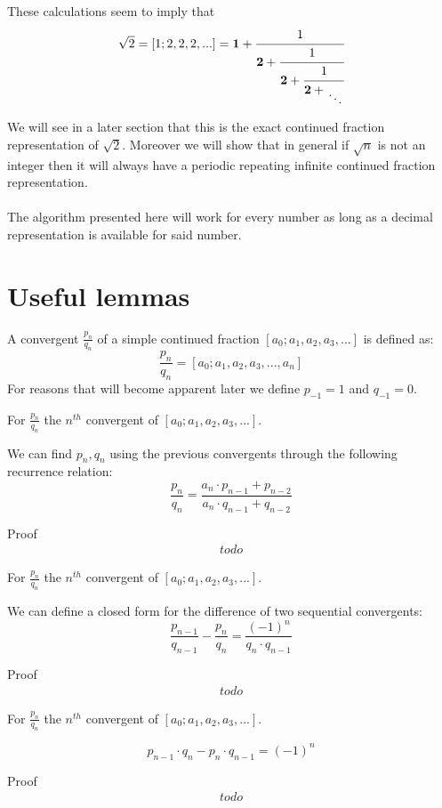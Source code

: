 \documentclass[a4paper]{article}
\begin{document}
These calculations seem to imply that 
$$
\sqrt{2} = [1;2,2,2,...] =
\textbf{1} + \cfrac{1}{\textbf{2}+\cfrac{1}{\textbf{2} +\cfrac{1}{\textbf{2} + \CFDots}}}
$$

We will see in a later section that this is the exact continued fraction representation of $\sqrt{2}$. Moreover we will show that in general if $\sqrt{n}$ is not an integer then it will always have a periodic repeating infinite continued fraction representation. \\
\\
The algorithm presented here will work for every number as long as a decimal representation is available for said number.

\section{Useful lemmas}
\begin{definition}\label{convergents}
A convergent $\frac{p_n}{q_n}$ of a simple continued fraction $[a_0; a_1, a_2, a_3, ...]$ is defined as:
$$ 
\frac{p_n}{q_n} = [a_0; a_1, a_2, a_3, ..., a_n]
$$
For reasons that will become apparent later we define $p_{-1} = 1$ and $q_{-1} = 0$.
\end{definition}

\begin{lemma} \label{lemma1}
For $\frac{p_{n}}{q_n}$ the $n^{th}$ convergent of $[a_0; a_1, a_2, a_3, ...]$. 
  
We can find $p_n, q_n$ using the previous convergents through the following recurrence relation:
$$
\frac{p_{n}}{q_n} = \frac{a_n \cdot p_{n-1} + p_{n-2}}{a_n \cdot q_{n-1} + q_{n-2}}
$$

Proof
\begin{gather*}
todo
\end{gather*}
\end{lemma}

\begin{lemma} \label{lemma2}
For $\frac{p_{n}}{q_n}$ the $n^{th}$ convergent of $[a_0; a_1, a_2, a_3, ...]$. 
  
We can define a closed form for the difference of two sequential convergents:
$$
\frac{p_{n-1}}{q_{n-1}} - \frac{p_{n}}{q_n} = \frac{(-1)^n}{q_n \cdot q_{n-1}}
$$

Proof
\begin{gather*}
todo
\end{gather*}
\end{lemma}

\begin{lemma} \label{lemma3}
For $\frac{p_{n}}{q_n}$ the $n^{th}$ convergent of $[a_0; a_1, a_2, a_3, ...]$. 
  
$$
p_{n-1} \cdot q_n - p_{n} \cdot q_{n-1} = (-1)^n
$$

Proof
\begin{gather*}
todo
\end{gather*}
\end{lemma}
\end{document}
